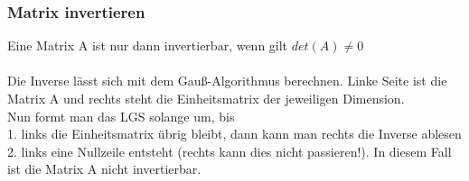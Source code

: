 \documentclass[6pt,a4paper]{scrartcl}
\begin{document}
\begin{multicols*}{3}
\subsubsection{Matrix invertieren}
Eine Matrix A ist nur dann invertierbar, wenn gilt $det(A) \neq 0$\\
\\
Die Inverse lässt sich mit dem Gauß-Algorithmus berechnen. Linke Seite ist die Matrix A und rechts steht die Einheitsmatrix der jeweiligen Dimension. \\
Nun formt man das LGS solange um, bis \\
1. links die Einheitsmatrix übrig bleibt, dann kann man rechts die Inverse ablesen \\
2. links eine Nullzeile entsteht (rechts kann dies nicht passieren!). In diesem Fall ist die Matrix A nicht invertierbar.\\
\\
\end{multicols*}


\end{document}
